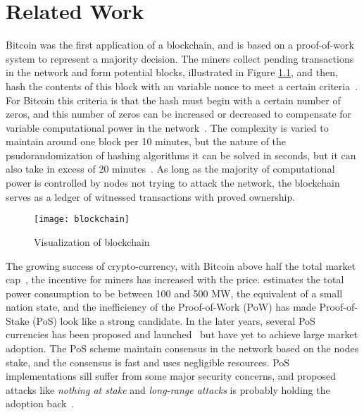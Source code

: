 \chapter{Related Work}
\label{chap:related_work}
Bitcoin was the first application of a blockchain, and is based on a proof-of-work system to represent a majority decision. The miners collect pending transactions in the network and form potential blocks, illustrated in Figure \ref{fig:blockchain}, and then, hash the contents of this block with an variable nonce to meet a certain criteria~\cite{bitcoin2008}. For Bitcoin this criteria is that the hash must begin with a certain number of zeros, and this number of zeros can be increased or decreased to compensate for variable computational power in the network~\cite{bitcoin2008}. The complexity is varied to maintain around one block per 10 minutes, but the nature of the psudorandomization of hashing algorithms it can be solved in seconds, but it can also take in excess of 20 minutes~\cite{blockchain_info}. As long as the majority of computational power is controlled by nodes not trying to attack the network, the blockchain serves as a ledger of witnessed transactions with proved ownership.

\begin{figure}[h]
    \centering
    \texttt{[image: blockchain]}
    \caption{Visualization of blockchain \cite{bitcoin2008}}
    \label{fig:blockchain}
\end{figure}

The growing success of crypto-currency, with Bitcoin above half the total market cap~\cite{coinmarketcap}, the incentive for miners has increased with the price. \cite{VRANKEN20171} estimates the total power consumption to be between 100 and 500 MW, the equivalent of a small nation state, and the inefficiency of the Proof-of-Work (PoW) has made Proof-of-Stake (PoS) look like a strong candidate. In the later years, several PoS currencies has been proposed and launched~\cite{Li2017,nxt_whitepaper,blackcoin_pos} but have yet to achieve large market adoption. The PoS scheme maintain consensus in the network based on the nodes stake, and the consensus is fast and uses negligible resources. PoS implementations sill suffer from some major security concerns, and proposed attacks like \textit{nothing at stake} and \textit{long-range attacks} is probably holding the adoption back~\cite{Li2017}.

\newpage

